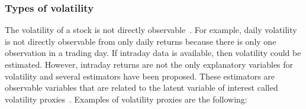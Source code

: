 \subsubsection{Types of volatility}

The volatility of a stock is not directly observable~\cite{tsay2005,engle1993}. For example, daily volatility is not directly observable from only daily returns because there is only one observation in a trading day.  If intraday data is available, then volatility could be estimated. However, intraday returns are not the only explanatory variables for volatility and several estimators have been proposed. These estimators are observable variables that are related to the latent variable of interest called volatility proxies~\cite{devilderetal2007}. Examples of volatility proxies are the following: 


